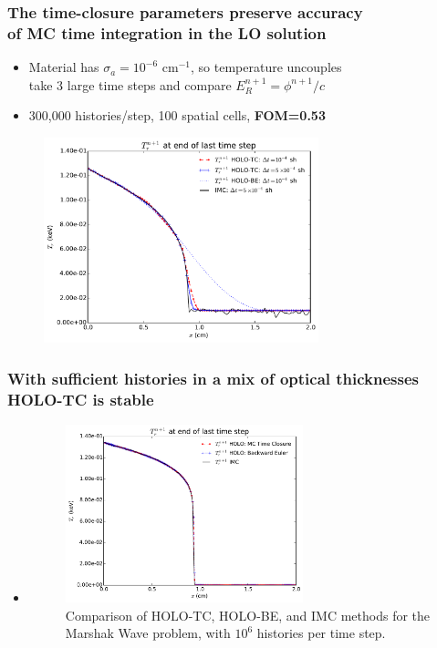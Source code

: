 \documentclass[xcolor=dvipsnames,hyperref={pdfpagelabels=false},unknownkeysallowed]{beamer}
\newcommand{\colG}[1]{{\color{Gray!110} #1}}
\newlength{\wideitemsep}
\let\olditem\item
\renewcommand{\item}{\setlength{\itemsep}{\wideitemsep}\olditem}
\begin{document}
\begin{frame}
    \frametitle{The time-closure parameters preserve accuracy \\ of MC time integration  in the LO solution}
    \fontsize{10.0pt}{10.0pt}\selectfont
    \vspace{0.1in}
    \begin{itemize}
        \item Material has $\sigma_a = 10^{-6}$ cm$^{-1}$, so temperature uncouples  \\ \colG{take 3 large time
                steps and compare $E_{R}^{n+1}=\phi^{n+1}/c$}
            \item 300,000 histories/step, 100 spatial cells, \textbf{FOM=0.53}
    \end{itemize}
\begin{figure}[H]
  \centering
    \includegraphics[width=0.71\textwidth]{thin_temp_compare.pdf}
\end{figure}
\end{frame}


\begin{frame}
    \frametitle{With sufficient histories in a mix of optical thicknesses \\ HOLO-TC is stable}
    \fontsize{8.0pt}{10.0pt}\selectfont
    \vspace{0.1in}
    \begin{itemize}
        \item \begin{figure}[H]
    \centering
    \includegraphics[width=0.65\textwidth]{marshak_time_cont_compare.pdf}
    \caption{\label{fig:marshak_tc} Comparison of HOLO-TC, HOLO-BE, and IMC methods for
the Marshak Wave problem, with $10^6$ histories per time step.}
\end{figure}
    \end{itemize}
\end{frame}
\end{document}
